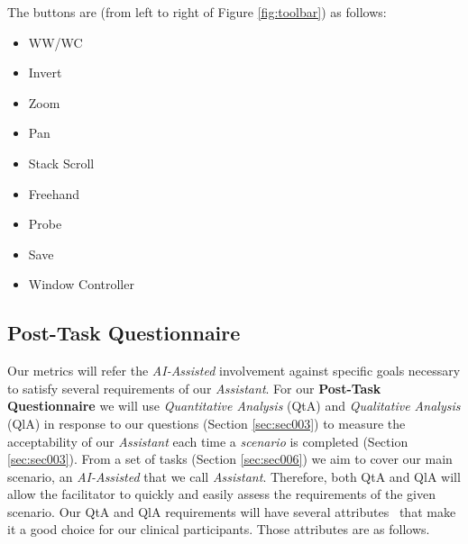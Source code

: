 \hfill


\hfill

The buttons are (from left to right of Figure \ref{fig:toolbar}) as follows:

\hfill

\begin{itemize}
\item WW/WC
\item Invert
\item Zoom
\item Pan
\item Stack Scroll
\item Freehand
\item Probe
\item Save
\item Window Controller
\end{itemize}

\hfill

\clearpage

























\subsection{Post-Task Questionnaire}

Our metrics will refer the \textit{AI-Assisted} involvement against specific goals necessary to satisfy several requirements of our \textit{Assistant}. For our \textbf{Post-Task Questionnaire} we will use \textit{Quantitative Analysis} (QtA) and \textit{Qualitative Analysis} (QlA) in response to our questions (Section \ref{sec:sec003}) to measure the acceptability of our \textit{Assistant} each time a \textit{scenario} is completed (Section \ref{sec:sec003}). From a set of tasks (Section \ref{sec:sec006}) we aim to cover our main scenario, an \textit{AI-Assisted} that we call \textit{Assistant}. Therefore, both QtA and QlA will allow the facilitator to quickly and easily assess the requirements of the given scenario. Our QtA and QlA requirements will have several attributes~\cite{joyce2017healthcare} that make it a good choice for our clinical participants. Those attributes are as follows.

